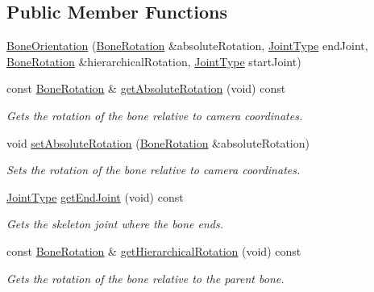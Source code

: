 \subsection*{\-Public \-Member \-Functions}
\begin{DoxyCompactItemize}
\item 
\hyperlink{class_bone_orientation_a33af8f225ae030fef80940c733d50338}{\-Bone\-Orientation} (\hyperlink{class_bone_rotation}{\-Bone\-Rotation} \&absolute\-Rotation, \hyperlink{joint_type_8h_af92f943e3dc4a7d1fb537fa481094fa9}{\-Joint\-Type} end\-Joint, \hyperlink{class_bone_rotation}{\-Bone\-Rotation} \&hierarchical\-Rotation, \hyperlink{joint_type_8h_af92f943e3dc4a7d1fb537fa481094fa9}{\-Joint\-Type} start\-Joint)
\item 
const \hyperlink{class_bone_rotation}{\-Bone\-Rotation} \& \hyperlink{class_bone_orientation_aceb1b795cba77956baecaaf449bb78c2}{get\-Absolute\-Rotation} (void) const 
\begin{DoxyCompactList}\small\item\em \-Gets the rotation of the bone relative to camera coordinates. \end{DoxyCompactList}\item 
void \hyperlink{class_bone_orientation_a9414d91ba4107451208e972821fa210e}{set\-Absolute\-Rotation} (\hyperlink{class_bone_rotation}{\-Bone\-Rotation} \&absolute\-Rotation)
\begin{DoxyCompactList}\small\item\em \-Sets the rotation of the bone relative to camera coordinates. \end{DoxyCompactList}\item 
\hyperlink{joint_type_8h_af92f943e3dc4a7d1fb537fa481094fa9}{\-Joint\-Type} \hyperlink{class_bone_orientation_aff03a9e6c54f92f060fb1e8ceffbab7a}{get\-End\-Joint} (void) const 
\begin{DoxyCompactList}\small\item\em \-Gets the skeleton joint where the bone ends. \end{DoxyCompactList}\item 
const \hyperlink{class_bone_rotation}{\-Bone\-Rotation} \& \hyperlink{class_bone_orientation_af17fdc4d83a1173ae94f1e609ed9e1ad}{get\-Hierarchical\-Rotation} (void) const 
\begin{DoxyCompactList}\small\item\em \-Gets the rotation of the bone relative to the parent bone. \end{DoxyCompactList}\item 

\end{DoxyCompactItemize}
